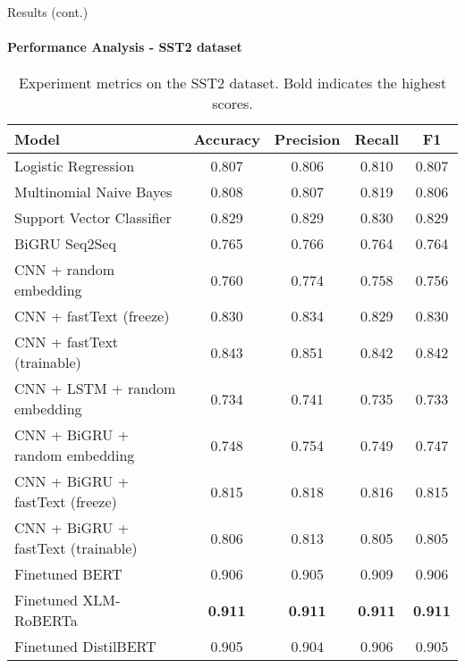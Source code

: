 \begin{frame}{Results (cont.)}
\framesubtitle{Performance Analysis - SST2 dataset}
\begin{table}
\small{
\begin{tabular*}{\textwidth}{@{\extracolsep\fill}lcccc}
\hline
\textbf{Model}                & \textbf{Accuracy} & \textbf{Precision} & \textbf{Recall} &  \textbf{F1} \\ \hline
Logistic Regression   & 0.807 & 0.806 & 0.810 & 0.807 \\ 
Multinomial Naive Bayes   & 0.808 & 0.807 & 0.819 & 0.806 \\ 
Support Vector Classifier & 0.829 & 0.829 & 0.830 & 0.829  \\ \hline
BiGRU Seq2Seq  & 0.765 & 0.766 & 0.764 & 0.764 \\ \hline
CNN + random embedding  & 0.760 & 0.774 & 0.758 & 0.756   \\
CNN + fastText (freeze)   & 0.830 & 0.834 & 0.829 & 0.830 \\
CNN + fastText (trainable) & 0.843 & 0.851 & 0.842 & 0.842 \\ \hline

CNN + LSTM + random embedding  & 0.734 & 0.741 & 0.735 & 0.733  \\
CNN + BiGRU + random embedding     & 0.748 & 0.754 & 0.749 & 0.747   \\
CNN + BiGRU + fastText (freeze)   & 0.815 & 0.818 & 0.816 & 0.815  \\
CNN + BiGRU + fastText (trainable) & 0.806 & 0.813 & 0.805 & 0.805 \\ \hline 
Finetuned BERT & 0.906 & 0.905 & 0.909 & 0.906  \\
Finetuned XLM-RoBERTa & \textbf{0.911} & \textbf{0.911} & \textbf{0.911} & \textbf{0.911}  \\ \hline
Finetuned DistilBERT  & 0.905 & 0.904 & 0.906 & 0.905  \\ \hline
\end{tabular*}
}
\caption{Experiment metrics on the SST2 dataset. Bold indicates the highest scores.} \label{tab:result-SST2}
\end{table}
\end{frame}

